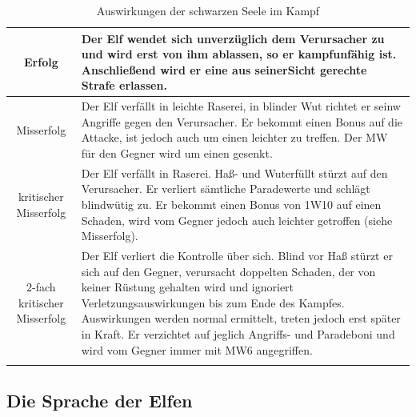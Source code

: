 \begin{longtable}{c|p{10cm}}
Erfolg & Der Elf wendet sich unverzüglich dem Verursacher zu und
wird erst von ihm ablassen, so er kampfunfähig ist. Anschließend
wird er eine aus seinerSicht gerechte Strafe erlassen.\\

\hline

Misserfolg & Der Elf verfällt in leichte Raserei, in blinder Wut
richtet er seinw Angriffe gegen den Verursacher. Er bekommt einen
Bonus auf die Attacke, ist jedoch auch um einen leichter zu treffen.
Der MW für den Gegner wird um einen gesenkt.\\

\hline

kritischer Misserfolg & Der Elf verfällt in Raserei. Haß- und
Wuterfüllt stürzt auf den Verursacher. Er verliert sämtliche
Paradewerte und schlägt blindwütig zu. Er bekommt einen Bonus von
1W10 auf einen Schaden, wird vom Gegner jedoch auch leichter
getroffen (siehe Misserfolg).\\

\hline

2-fach kritischer Misserfolg & Der Elf verliert die Kontrolle über
sich. Blind vor Haß stürzt er sich auf den Gegner, verursacht
doppelten Schaden, der von keiner Rüstung gehalten wird und
ignoriert Verletzungsauswirkungen bis zum Ende des Kampfes.
Auswirkungen werden normal ermittelt, treten jedoch erst später in
Kraft. Er verzichtet auf jeglich Angriffs- und Paradeboni und wird
vom Gegner immer mit MW6 angegriffen.\\

\caption{Auswirkungen der schwarzen Seele im Kampf}
\end{longtable}


\subsection{Die Sprache der Elfen}

